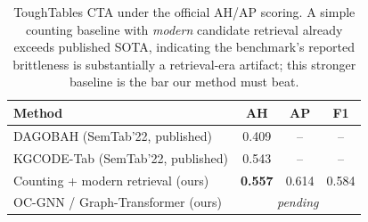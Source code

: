 \begin{table}[t]
\centering
\caption{ToughTables CTA under the official AH/AP scoring. A simple counting
baseline with \emph{modern} candidate retrieval already exceeds published SOTA,
indicating the benchmark's reported brittleness is substantially a
retrieval-era artifact; this stronger baseline is the bar our method must beat.}
\label{tab:toughtables}
\begin{tabular}{lccc}
\toprule
Method & AH & AP & F1 \\
\midrule
DAGOBAH (SemTab'22, published) & 0.409 & -- & -- \\
KGCODE-Tab (SemTab'22, published) & 0.543 & -- & -- \\
\midrule
Counting + modern retrieval (ours) & \textbf{0.557} & 0.614 & 0.584 \\
OC-GNN / Graph-Transformer (ours) & \multicolumn{3}{c}{\emph{pending}} \\
\bottomrule
\end{tabular}
\end{table}
